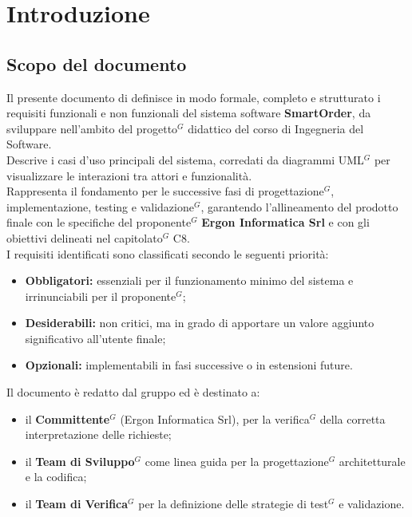 \section{Introduzione}
	\subsection{Scopo del documento}
	Il presente documento di  definisce in modo formale, completo e strutturato i requisiti funzionali e non funzionali del sistema software \textbf{SmartOrder}, da sviluppare nell'ambito del progetto$^G$ didattico del corso di Ingegneria del Software.\\
	Descrive i casi d'uso principali del sistema, corredati da diagrammi UML$^G$ per visualizzare le interazioni tra attori e funzionalità.\\
	Rappresenta il fondamento per le successive fasi di progettazione$^G$, implementazione, testing e validazione$^G$, garantendo l'allineamento del prodotto finale con le specifiche del proponente$^G$ \textbf{Ergon Informatica Srl} e con gli obiettivi delineati nel capitolato$^G$ C8.\\
	I requisiti identificati sono classificati secondo le seguenti priorità:
	\vspace{-0.3em}
	\begin{itemize}
	    \item \textbf{Obbligatori:} essenziali per il funzionamento minimo del sistema e irrinunciabili per il proponente$^G$;
	    \item \textbf{Desiderabili:} non critici, ma in grado di apportare un valore aggiunto significativo all'utente finale;
	    \item \textbf{Opzionali:} implementabili in fasi successive o in estensioni future.
	\end{itemize}

	Il documento è redatto dal gruppo \textbf{} ed è destinato a:

	\vspace{-0.3em}
	\begin{itemize}
	    \item il \textbf{Committente$^G$} (Ergon Informatica Srl), per la verifica$^G$ della corretta interpretazione delle richieste;
	    \item il \textbf{Team di Sviluppo$^G$} come linea guida per la progettazione$^G$ architetturale e la codifica;
	    \item il \textbf{Team di Verifica$^G$} per la definizione delle strategie di test$^G$ e validazione.
	\end{itemize}

